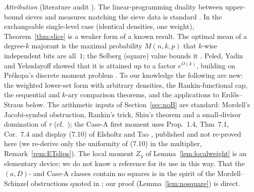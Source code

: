 \documentclass[10pt,reqno]{amsart}
\theoremstyle{definition}
\theoremstyle{remark}
\begin{document}
\emph{Attribution} (literature audit \cite{NovAudit}).  The
linear-programming duality between upper-bound sieves and measures matching
the sieve data is standard \cite[Thm.~5]{Tao254A}
\cite[Prop.~4]{BGP}.  In the exchangeable single-level case (identical
densities, one weight), Theorem~\ref{thm:slice} is a weaker form of a
known result.  The optimal mean of a degree-$k$ majorant is the maximal
probability $M(n,k,p)$ that $k$-wise independent bits are all~$1$; the
Selberg (square) value bounds it \cite[Thm.~23]{BGP}.  Peled, Yadin and
Yehudayoff \cite[Thm.~1.1]{PYY} showed that it is attained up to a factor
$e^{O(k)}$, building on Pr\'ekopa's discrete moment problem \cite{Prekopa}.
To our knowledge the following are new: the weighted lower-set form with
arbitrary densities, the Rankin-functional cap, the sequential and $k$-ary
comparison theorems, and the applications to Erd\H{o}s--Straus below.
The arithmetic inputs of Section~\ref{sec:noB} are standard: Mordell's
Jacobi-symbol obstruction, Rankin's trick, Shiu's theorem \cite{Shiu} and
a small-divisor domination of $\tau$ (cf.\ \cite{Landreau}); the Case-A
first moment uses Prop.~1.4, Thm~7.1, Cor.~7.4 and display (7.10) of
Elsholtz and Tao \cite{ElsholtzTao}, published and not re-proved here
(we re-derive only the uniformity of (7.10) in the multiplier,
Remark~\ref{rem:ETslips}).  The local moment $Z_y$ of
Lemma~\ref{lem:localweight} is an elementary device; we do not know a
reference for its use in this way.  That the $(a,D)$- and Case-A classes
contain no squares is in the spirit of the Mordell--Schinzel
obstructions quoted in \cite{ElsholtzTao}; our proof
(Lemma~\ref{lem:nosquare}) is direct.
\end{document}
